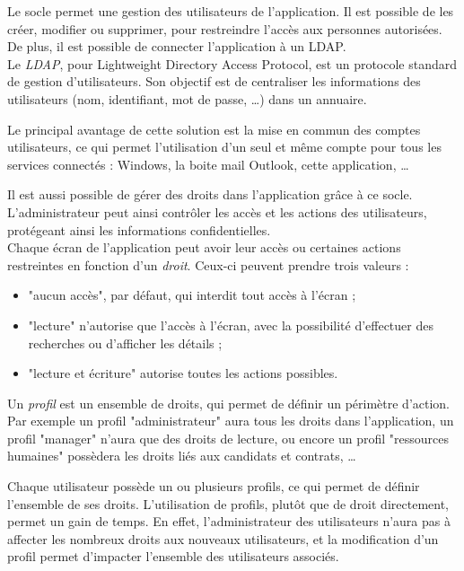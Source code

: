
Le socle permet une gestion des utilisateurs de l'application.
Il est possible de les créer, modifier ou supprimer, pour restreindre l'accès aux personnes autorisées.
De plus, il est possible de connecter l'application à un LDAP.
\\

Le \textit{LDAP}, pour Lightweight Directory Access Protocol, est un protocole standard de gestion d'utilisateurs.
Son objectif est de centraliser les informations des utilisateurs (nom, identifiant, mot de passe, \ldots) dans un annuaire.

Le principal avantage de cette solution est la mise en commun des comptes utilisateurs, ce qui permet l'utilisation d'un seul et même compte pour tous les services connectés : Windows, la boite mail Outlook, cette application, \ldots



Il est aussi possible de gérer des droits dans l'application grâce à ce socle.
L'administrateur peut ainsi contrôler les accès et les actions des utilisateurs, protégeant ainsi les informations confidentielles.
\\

Chaque écran de l'application peut avoir leur accès ou certaines actions restreintes en fonction d'un \textit{droit}.
Ceux-ci peuvent prendre trois valeurs : 
\begin{itemize}
	\item "aucun accès", par défaut, qui interdit tout accès à l'écran ;
	\item "lecture" n'autorise que l'accès à l'écran, avec la possibilité d'effectuer des recherches ou d'afficher les détails ;
	\item "lecture et écriture" autorise toutes les actions possibles.
\end{itemize}

Un \textit{profil} est un ensemble de droits, qui permet de définir un périmètre d'action.
Par exemple un profil "administrateur" aura tous les droits dans l'application, un profil "manager" n'aura que des droits de lecture, ou encore un profil "ressources humaines" possèdera les droits liés aux candidats et contrats, \ldots

Chaque utilisateur possède un ou plusieurs profils, ce qui permet de définir l'ensemble de ses droits.
L'utilisation de profils, plutôt que de droit directement, permet un gain de temps.
En effet, l'administrateur des utilisateurs n'aura pas à affecter les nombreux droits aux nouveaux utilisateurs, et la modification d'un profil permet d'impacter l'ensemble des utilisateurs associés.
\\

